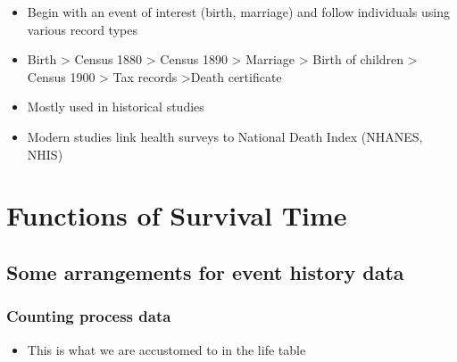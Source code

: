 \documentclass[
  letterpaper,
  DIV=11,
  numbers=noendperiod]{scrreprt}
\providecommand{\tightlist}{%
  \setlength{\itemsep}{0pt}\setlength{\parskip}{0pt}}\usepackage{longtable,booktabs,array}
\begin{document}
\begin{itemize}
  \begin{itemize}
  \tightlist
  \item
    Begin with an event of interest (birth, marriage) and follow
    individuals using various record types
  \item
    Birth \textgreater{} Census 1880 \textgreater{} Census 1890
    \textgreater{} Marriage \textgreater{} Birth of children
    \textgreater{} Census 1900 \textgreater{} Tax records
    \textgreater Death certificate
  \item
    Mostly used in historical studies
  \item
    Modern studies link health surveys to National Death Index (NHANES,
    NHIS)
  \end{itemize}
\end{itemize}


\hypertarget{functions-of-survival-time}{%
\chapter{Functions of Survival Time}\label{functions-of-survival-time}}

\hypertarget{some-arrangements-for-event-history-data}{%
\section{Some arrangements for event history
data}\label{some-arrangements-for-event-history-data}}

\hypertarget{counting-process-data}{%
\subsection{Counting process data}\label{counting-process-data}}

\begin{itemize}
\tightlist
\item
  This is what we are accustomed to in the life table
\end{itemize}
\end{document}
